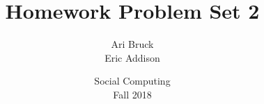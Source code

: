 \documentclass{article}
\title{Homework Problem Set 2}
\author{Ari Bruck\\Eric Addison}
\date{Social Computing\\Fall 2018}
\begin{document}
\maketitle
\pagebreak



\pagebreak

\end{document}

